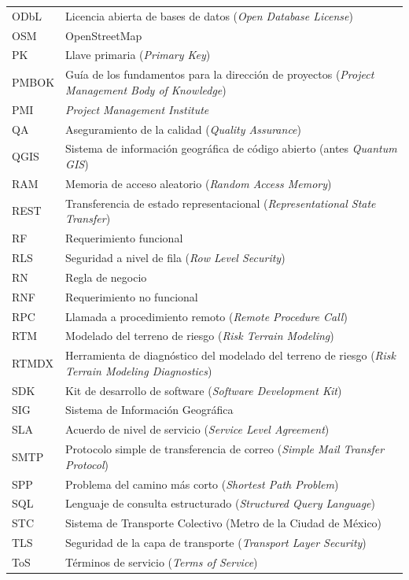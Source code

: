 \begin{longtable}{@{}L{2.4cm}p{\dimexpr\textwidth-2.4cm-2\tabcolsep\relax}@{}}
ODbL & Licencia abierta de bases de datos (\textit{Open Database License}) \\
OSM & OpenStreetMap \\
PK & Llave primaria (\textit{Primary Key}) \\
PMBOK & Guía de los fundamentos para la dirección de proyectos (\textit{Project Management Body of Knowledge}) \\
PMI & \textit{Project Management Institute} \\
QA & Aseguramiento de la calidad (\textit{Quality Assurance}) \\
QGIS & Sistema de información geográfica de código abierto (antes \textit{Quantum GIS}) \\
RAM & Memoria de acceso aleatorio (\textit{Random Access Memory}) \\
REST & Transferencia de estado representacional (\textit{Representational State Transfer}) \\
RF & Requerimiento funcional \\
RLS & Seguridad a nivel de fila (\textit{Row Level Security}) \\
RN & Regla de negocio \\
RNF & Requerimiento no funcional \\
RPC & Llamada a procedimiento remoto (\textit{Remote Procedure Call}) \\
RTM & Modelado del terreno de riesgo (\textit{Risk Terrain Modeling}) \\
RTMDX & Herramienta de diagnóstico del modelado del terreno de riesgo (\textit{Risk Terrain Modeling Diagnostics}) \\
SDK & Kit de desarrollo de software (\textit{Software Development Kit}) \\
SIG & Sistema de Información Geográfica \\
SLA & Acuerdo de nivel de servicio (\textit{Service Level Agreement}) \\
SMTP & Protocolo simple de transferencia de correo (\textit{Simple Mail Transfer Protocol}) \\
SPP & Problema del camino más corto (\textit{Shortest Path Problem}) \\
SQL & Lenguaje de consulta estructurado (\textit{Structured Query Language}) \\
STC & Sistema de Transporte Colectivo (Metro de la Ciudad de México) \\
TLS & Seguridad de la capa de transporte (\textit{Transport Layer Security}) \\
ToS & Términos de servicio (\textit{Terms of Service}) \\

\end{longtable}
